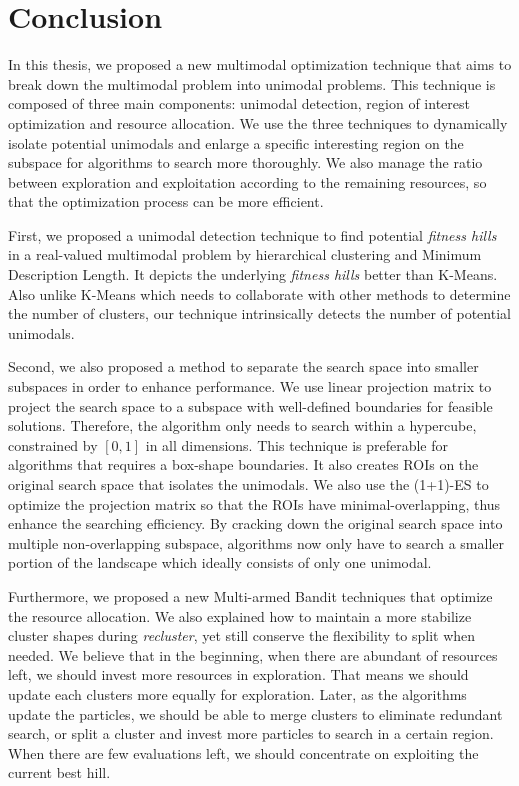 \chapter{Conclusion}
\label{chapter:conclusion}

In this thesis, we proposed a new multimodal optimization technique that aims to break down the multimodal problem into unimodal problems.
This technique is composed of three main components: unimodal detection, region of interest optimization and resource allocation.
We use the three techniques to dynamically isolate potential unimodals and enlarge a specific interesting region on the subspace for algorithms to search more thoroughly.
We also manage the ratio between exploration and exploitation according to the remaining resources,
so that the optimization process can be more efficient.

First, we proposed a unimodal detection technique to find potential \textit{fitness hills} in a real-valued multimodal problem 
by hierarchical clustering and Minimum Description Length.
It depicts the underlying \textit{fitness hills} better than K-Means.
Also unlike K-Means which needs to collaborate with other methods to determine the number of clusters,
our technique intrinsically detects the number of potential unimodals.

Second, we also proposed a method to separate the search space into smaller subspaces in order to enhance performance.
We use linear projection matrix to project the search space to a subspace with well-defined boundaries for feasible solutions.
Therefore, the algorithm only needs to search within a hypercube, constrained by $[0,1]$ in all dimensions.
This technique is preferable for algorithms that requires a box-shape boundaries.
It also creates ROIs on the original search space that isolates the unimodals.
We also use the (1+1)-ES to optimize the projection matrix so that the ROIs have minimal-overlapping, thus enhance the searching efficiency.
By cracking down the original search space into multiple non-overlapping subspace, 
algorithms now only have to search a smaller portion of the landscape which ideally consists of only one unimodal.

Furthermore, we proposed a new Multi-armed Bandit techniques that optimize the resource allocation.
We also explained how to maintain a more stabilize cluster shapes during \textit{recluster}, 
yet still conserve the flexibility to split when needed.
We believe that in the beginning, when there are abundant of resources left, we should invest more resources in exploration.
That means we should update each clusters more equally for exploration.
Later, as the algorithms update the particles, we should be able to merge clusters to eliminate redundant search,
or split a cluster and invest more particles to search in a certain region.
When there are few evaluations left, we should concentrate on exploiting the current best hill.

